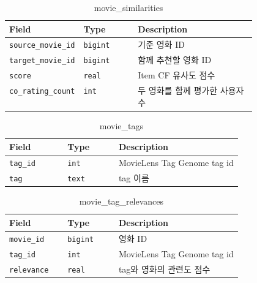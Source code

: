 \documentclass[11pt,a4paper]{article}
\renewcommand{\arraystretch}{1.18}
\begin{document}
\begin{table}[H]
\centering
\footnotesize
\setlength{\tabcolsep}{5pt}
\renewcommand{\arraystretch}{1.28}
\begin{tabularx}{\linewidth}{@{}>{\RaggedRight\arraybackslash}p{0.25\linewidth}>{\RaggedRight\arraybackslash}p{0.22\linewidth}>{\RaggedRight\arraybackslash}X@{}}
\toprule
\textbf{Field} & \textbf{Type} & \textbf{Description} \\
\midrule
\texttt{source\_\allowbreak{}movie\_\allowbreak{}id} & \texttt{bigint} & 기준 영화 ID \\
\texttt{target\_\allowbreak{}movie\_\allowbreak{}id} & \texttt{bigint} & 함께 추천할 영화 ID \\
\texttt{score} & \texttt{real} & Item CF 유사도 점수 \\
\texttt{co\_\allowbreak{}rating\_\allowbreak{}count} & \texttt{int} & 두 영화를 함께 평가한 사용자 수 \\
\bottomrule
\end{tabularx}
\caption{movie\_similarities}
\end{table}

\begin{table}[H]
\centering
\footnotesize
\setlength{\tabcolsep}{5pt}
\renewcommand{\arraystretch}{1.28}
\begin{tabularx}{\linewidth}{@{}>{\RaggedRight\arraybackslash}p{0.25\linewidth}>{\RaggedRight\arraybackslash}p{0.22\linewidth}>{\RaggedRight\arraybackslash}X@{}}
\toprule
\textbf{Field} & \textbf{Type} & \textbf{Description} \\
\midrule
\texttt{tag\_\allowbreak{}id} & \texttt{int} & MovieLens Tag Genome tag id \\
\texttt{tag} & \texttt{text} & tag 이름 \\
\bottomrule
\end{tabularx}
\caption{movie\_tags}
\end{table}

\begin{table}[H]
\centering
\footnotesize
\setlength{\tabcolsep}{5pt}
\renewcommand{\arraystretch}{1.28}
\begin{tabularx}{\linewidth}{@{}>{\RaggedRight\arraybackslash}p{0.25\linewidth}>{\RaggedRight\arraybackslash}p{0.22\linewidth}>{\RaggedRight\arraybackslash}X@{}}
\toprule
\textbf{Field} & \textbf{Type} & \textbf{Description} \\
\midrule
\texttt{movie\_\allowbreak{}id} & \texttt{bigint} & 영화 ID \\
\texttt{tag\_\allowbreak{}id} & \texttt{int} & MovieLens Tag Genome tag id \\
\texttt{relevance} & \texttt{real} & tag와 영화의 관련도 점수 \\
\bottomrule
\end{tabularx}
\caption{movie\_tag\_relevances}
\end{table}
\end{document}
